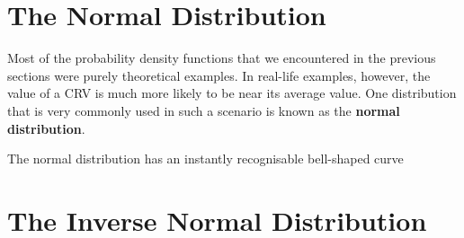 \newpage

\section{The Normal Distribution}

Most of the probability density functions that we encountered in the previous sections were purely theoretical examples. In real-life examples, however, the value of a CRV is much more likely to be near its average value. One distribution that is very commonly used in such a scenario is known as the \textbf{normal distribution}. 

The normal distribution has an instantly recognisable bell-shaped curve
\begin{center}
\end{center}
\section{The Inverse Normal Distribution}
